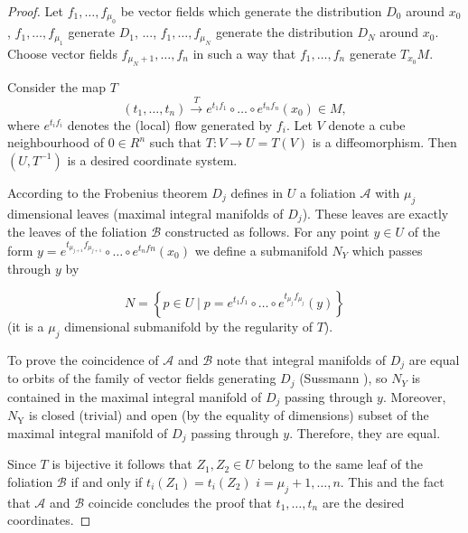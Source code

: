 \documentclass[leqno]{article}
\theoremstyle{plain}
\numberwithin{equation}{section}
\begin{document}
\begin{proof}
	Let $f_{1}, \ldots, f_{\mu_{0}}$ be vector fields which generate the distribution $D_{0}$ around $x_{0}$, $f_{1}, \ldots, f_{\mu_{1}}$ generate $D_{1}$, ..., $f_{1}, \ldots, f_{\mu_{N}}$ generate the distribution $D_{N}$ around $x_{0}$.
	Choose vector fields $f_{\mu_{N}+1}, \ldots, f_{n}$ in such a way that $f_{1}, \ldots, f_{n}$ generate $T_{x_{0}} M$.
	
	Consider the map $T$
	\begin{equation*}
		\left(t_{1}, \ldots, t_{n}\right) \stackrel{T}{\longrightarrow} e^{t_{1} f_{1}} \circ \ldots \circ e^{t_{n} f_{n}}\left(x_{0}\right) \in M,
	\end{equation*}
	where $e^{t_{i} f_{i}}$ denotes the (local) flow generated by $f_{i}$. 
	Let $V$ denote a cube neighbourhood of $0 \in R^{n}$ such that $T: V \to U=T(V)$ is a diffeomorphism.
	Then $\left(U, T^{-1}\right)$ is a desired coordinate system.
	
	According to the Frobenius theorem $D_{j}$ defines in $U$ a foliation $\mathscr{A}$ with $\mu_j$ dimensional leaves (maximal integral manifolds of $D_{j}$). 
	These leaves are exactly the leaves of the foliation $\mathscr{B}$ constructed as follows. 
	For any point $y \in U$ of the form $y=e^{t_{\mu_{j+1}}f_{\mu_{j+1}} } \circ \ldots \circ e^{t_n f n}\left(x_{0}\right)$ we define a submanifold $N_{Y}$ which passes through $y$ by
	
	\begin{equation*}
		N=\left\{p \in U \mid p=e^{t_{1} f_{1}} \circ \ldots \circ e^{t_{\mu_{j}} f_{\mu_{j}}}(y)\right\}
	\end{equation*}
	(it is a $\mu_{j}$ dimensional submanifold by the regularity of $T$).
	
	To prove the coincidence of $\mathscr{A}$ and $\mathscr{B}$ note that integral manifolds of $D_{j}$ are equal to orbits of the family of vector fields generating $D_{j}$ (Sussmann \cite{6}), so $N_{Y}$ is contained in the maximal integral manifold of $D_{j}$ passing through $y$. 
	Moreover, $N_{\mathrm{Y}}$ is closed (trivial) and open (by the equality of dimensions) subset of the maximal integral manifold of $D_{j}$ passing through $y$. 
	Therefore, they are equal.
	
	Since $T$ is bijective it follows that $Z_{1}, Z_{2} \in U$ belong to the same leaf of the foliation $\mathscr{B}$ if and only if $t_{i}\left(Z_{1}\right)=t_{i}\left(Z_{2}\right)$ $i=\mu_{j}+1, \ldots, n$. This and the fact that $\mathscr{A}$ and $\mathscr{B}$ coincide concludes the proof that $t_{1}, \ldots, t_{n}$ are the desired coordinates.
\end{proof}
\end{document}
